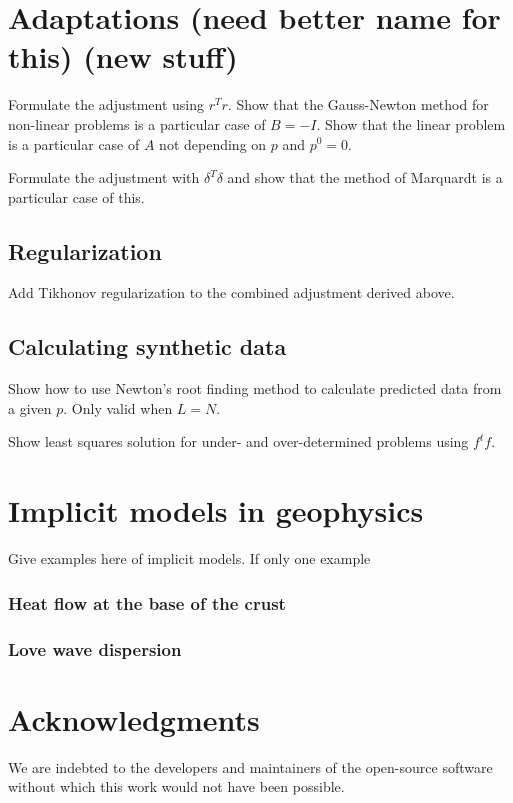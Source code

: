 \documentclass[twocolumn]{article}
\begin{document}
\section{Adaptations (need better name for this) (new stuff)}

Formulate the adjustment using $r^Tr$.
Show that the Gauss-Newton method
for non-linear problems
is a particular case of $B = -I$.
Show that the linear problem
is a particular case of $A$ not depending on $p$
and $p^0 = 0$.

Formulate the adjustment with $\delta^T\delta$
and show that the method of Marquardt
is a particular case of this.



\subsection{Regularization}

Add Tikhonov regularization to the combined adjustment derived above.



\subsection{Calculating synthetic data}

Show how to use Newton's root finding method to calculate predicted data from a
given $p$. Only valid when $L = N$.

Show least squares solution for under- and over-determined problems using
$f^tf$.

\section{Implicit models in geophysics}

Give examples here of implicit models.
If only one example


\subsubsection{Heat flow  at the base of the crust}

\subsubsection{Love wave dispersion}


\section{Acknowledgments}

We are indebted to the developers and maintainers of the open-source
software without which this work would not have been possible.




\end{document}

